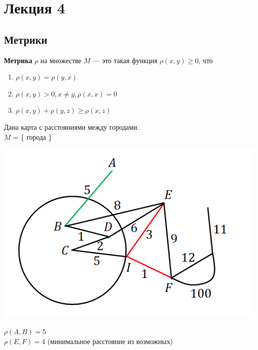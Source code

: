
\newpage
\section{Лекция 4}
\subsection{Метрики}
\begin{definition}
    \textbf{Метрика} $\rho$ на множестве $M$ --- это такая функция $\rho (x, y) \geqslant 0$, что 
    \begin{enumerate}
        \item $\rho (x, y) = \rho (y, x)$
        \item $\rho (x, y) > 0, x\neq y, \rho (x, x) = 0$ 
        \item $\rho (x, y) + \rho (y, z) \geqslant \rho (x, z)$
    \end{enumerate}
\end{definition}
Дана карта с расстояниями между городами.\\
$M$ = \{ города \}\begin{center}
    \includegraphics[scale=0.7]{l4_1.png}\end{center}
$\rho (A, B) = 5$\\
$\rho (E, F) = 4$ (минимальное расстояние из возможных)\\
\\
